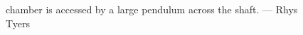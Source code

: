 \begin{figure}[t!]
\label{Ta Mokra}
\caption{   \protect{} chamber is accessed by a large pendulum across the \protect{} shaft. --- Rhys Tyers}
\end{figure}

